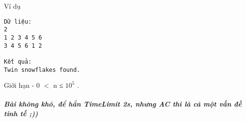 Ví dụ
\begin{verbatim}
Dữ liệu:
2
1 2 3 4 5 6
3 4 5 6 1 2

Kết quả:
Twin snowflakes found.
\end{verbatim}
Giới hạn
- 0 $<$ n ≤ $10^{5}$   .  

\paragraph{\textit{    Bài không khó, để hẳn TimeLimit 2s, nhưng AC thì là cả một vấn đề tinh tế ;))   }}